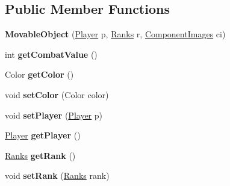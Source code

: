 \subsection*{Public Member Functions}
\begin{DoxyCompactItemize}
\item 
\hypertarget{classbasecomponents_1_1_movable_object_a784ff4289ccfaba95b966827f65ee903}{{\bfseries Movable\-Object} (\hyperlink{enumenums_1_1_player}{Player} p, \hyperlink{enumenums_1_1_ranks}{Ranks} r, \hyperlink{enumenums_1_1_component_images}{Component\-Images} ci)}\label{classbasecomponents_1_1_movable_object_a784ff4289ccfaba95b966827f65ee903}

\item 
\hypertarget{classbasecomponents_1_1_movable_object_a7294b4e8e8e938a3a3dfc62dcdb6d534}{int {\bfseries get\-Combat\-Value} ()}\label{classbasecomponents_1_1_movable_object_a7294b4e8e8e938a3a3dfc62dcdb6d534}

\item 
\hypertarget{classbasecomponents_1_1_movable_object_a7002ac8c77857efd2ea0679dde1fbb70}{Color {\bfseries get\-Color} ()}\label{classbasecomponents_1_1_movable_object_a7002ac8c77857efd2ea0679dde1fbb70}

\item 
\hypertarget{classbasecomponents_1_1_movable_object_a6d7d1ba6f4881b967c8a3cac4f58a57c}{void {\bfseries set\-Color} (Color color)}\label{classbasecomponents_1_1_movable_object_a6d7d1ba6f4881b967c8a3cac4f58a57c}

\item 
\hypertarget{classbasecomponents_1_1_movable_object_a045b7bda192aa78278771e76c45f2255}{void {\bfseries set\-Player} (\hyperlink{enumenums_1_1_player}{Player} p)}\label{classbasecomponents_1_1_movable_object_a045b7bda192aa78278771e76c45f2255}

\item 
\hypertarget{classbasecomponents_1_1_movable_object_a64c71ffdbebf9e7c1bae09f5eb6f381b}{\hyperlink{enumenums_1_1_player}{Player} {\bfseries get\-Player} ()}\label{classbasecomponents_1_1_movable_object_a64c71ffdbebf9e7c1bae09f5eb6f381b}

\item 
\hypertarget{classbasecomponents_1_1_movable_object_afa1342e4a099f25034916405f79deec2}{\hyperlink{enumenums_1_1_ranks}{Ranks} {\bfseries get\-Rank} ()}\label{classbasecomponents_1_1_movable_object_afa1342e4a099f25034916405f79deec2}

\item 
\hypertarget{classbasecomponents_1_1_movable_object_a4463632f3ab53be57a680f5c429bfb30}{void {\bfseries set\-Rank} (\hyperlink{enumenums_1_1_ranks}{Ranks} rank)}\label{classbasecomponents_1_1_movable_object_a4463632f3ab53be57a680f5c429bfb30}


\end{DoxyCompactItemize}
